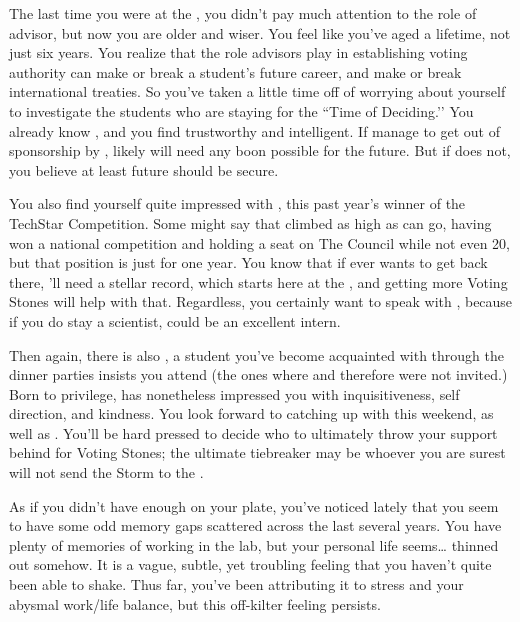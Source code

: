 \documentclass[char]{GL2020}
\begin{document}
The last time you were at the \pSchool{}, you didn't pay much attention to the role of advisor, but now you are older and wiser. You feel like you’ve aged a lifetime, not just six years. You realize that the role advisors play in establishing voting authority can make or break a student's future career, and make or break international treaties. So you've taken a little time off of worrying about yourself to investigate the \pTech{} students who are staying for the ``Time of Deciding.’’ You already know \cScholarship{}, and you find \cScholarship{\them} trustworthy and intelligent. If \cScholarship{\theydo} manage to get out of sponsorship by \cAntiChup{}, \cScholarship{} likely will need any boon possible for the future. But if \cScholarship{} does not, you believe at least \cScholarship{\their} future should be secure.

You also find yourself quite impressed with \cTechStar{\full}, this past year's winner of the TechStar Competition. Some might say that \cTechStar{\theyhave} climbed as high as \cTechStar{\they} can go, having won a national competition and holding a seat on The Council while not even 20, but that position is just for one year. You know that if \cTechStar{\they} ever wants to get back there, \cTechStar{\they}'ll need a stellar record, which starts here at the \pSc{}, and getting more Voting Stones will help with that. Regardless, you certainly want to speak with \cTechStar{}, because if you do stay a scientist, \cTechStar{\they} could be an excellent intern.  

Then again, there is also \cHeir{\full}, a student you've become acquainted with through the dinner parties \cHeir{\their} \cDiplomat{\auncle} \cDiplomat{} insists you attend (the ones where \cAntiChup{} and therefore \cScholarship{} were not invited.) Born to privilege, \cHeir{} has nonetheless impressed you with \cHeir{\their} inquisitiveness, self direction, and kindness. You look forward to catching up with \cHeir{\them} this weekend, as well as \cScholarship{}. You'll be hard pressed to decide who to ultimately throw your support behind for Voting Stones; the ultimate tiebreaker may be whoever you are surest will not send the Storm to the \pTech{}.

As if you didn't have enough on your plate, you've noticed lately that you seem to have some odd memory gaps scattered across the last several years. You have plenty of memories of working in the lab, but your personal life seems\ldots{} thinned out somehow. It is a vague, subtle, yet troubling feeling that you haven't quite been able to shake. Thus far, you've been attributing it to stress and your abysmal work/life balance, but this off-kilter feeling persists.
\end{document}
